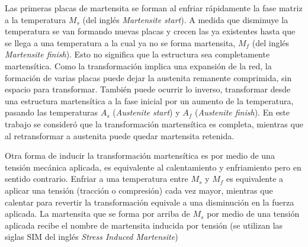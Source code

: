 \documentclass[a4paper,12pt,fleqn,twoside,openany]{book}
\begin{document}

Las primeras placas de martensita se forman al enfriar rápidamente la fase matriz a la temperatura $M_{s}$ (del inglés \textit{Martensite start}). 
A medida que disminuye la temperatura se van formando nuevas placas y crecen las ya existentes hasta que se llega a una temperatura 
a la cual ya no se forma martensita, $M_{f}$ (del inglés \textit{Martensite finish}). Esto no significa que la estructura sea completamente martensítica. 
Como la transformación implica una expansión de la red, la formación de varias placas puede dejar la austenita remanente comprimida, 
sin espacio para transformar. También puede ocurrir lo inverso, transformar desde una estructura martensítica a la fase inicial 
por un aumento de la temperatura, pasando las temperaturas $A_{s}$ (\textit{Austenite start}) y $A_{f}$ (\textit{Austenite finish}). En este trabajo se consideró que la transformación martensítica es completa, mientras que al retransformar a austenita puede quedar martensita retenida.

  

Otra forma de inducir la transformación martensítica es por medio de una tensión mecánica aplicada, es equivalente al calentamiento y enfriamiento pero en 
sentido contrario. Enfriar a una temperatura entre $M_{s}$ y $M_{f}$ es equivalente a aplicar una tensión (tracción o compresión) cada vez mayor, mientras que calentar para revertir la 
transformación equivale a una disminución en la fuerza aplicada. La martensita que se forma por arriba de $M_{s}$ por medio de una 
tensión aplicada recibe el nombre de martensita inducida por tensión (se utilizan las siglas SIM del inglés \textit{Stress Induced Martensite})

  
\end{document}
